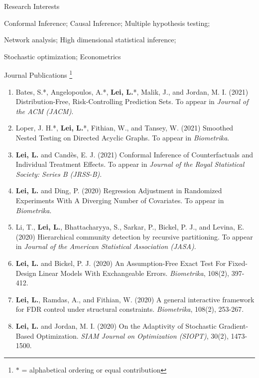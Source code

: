 \documentclass{article}
\begin{document}
\begin{large}
\noindent Research Interests
\end{large}

\vspace{3mm}
Conformal Inference; Causal Inference; Multiple hypothesis testing;

Network analysis; High dimensional statistical inference; 

Stochastic optimization; Econometrics

\vspace{3mm}

\clearpage
\begin{large}
\noindent Journal Publications \footnote{$\ast$ = alphabetical ordering or equal contribution}
\end{large}

\begin{enumerate}
\item Bates, S.*, Angelopoulos, A.*, \textbf{Lei, L.}*, Malik, J., and Jordan, M. I. (2021) Distribution-Free, Risk-Controlling Prediction Sets. To appear in \emph{Journal of the ACM (JACM)}.
\item Loper, J. H.*, \textbf{Lei, L.}*, Fithian, W., and Tansey, W. (2021) Smoothed Nested Testing on Directed Acyclic Graphs. To appear in \emph{Biometrika}.
\item \textbf{Lei, L.} and Cand\`{e}s, E. J. (2021) Conformal Inference of Counterfactuals and Individual Treatment Effects. To appear in \emph{Journal of the Royal Statistical Society: Series B (JRSS-B)}.
\item \textbf{Lei, L.} and Ding, P. (2020) Regression Adjustment in Randomized Experiments With A Diverging Number of Covariates. To appear in \emph{Biometrika}.
\item Li, T., \textbf{Lei, L.}, Bhattacharyya, S., Sarkar, P., Bickel, P. J., and Levina, E. (2020) Hierarchical community detection by recursive partitioning. To appear in \emph{Journal of the American Statistical Association (JASA)}.
\item \textbf{Lei, L.} and Bickel, P. J. (2020) An Assumption-Free Exact Test For Fixed-Design Linear Models With Exchangeable Errors. \emph{Biometrika}, 108(2), 397-412.
\item \textbf{Lei, L.}, Ramdas, A., and Fithian, W. (2020) A general interactive framework for FDR control under structural constraints. \emph{Biometrika}, 108(2), 253-267.
\item \textbf{Lei, L.} and Jordan, M. I. (2020) On the Adaptivity of Stochastic Gradient-Based Optimization. \emph{SIAM Journal on Optimization (SIOPT)}, 30(2), 1473-1500.

\end{enumerate}
\end{document}
